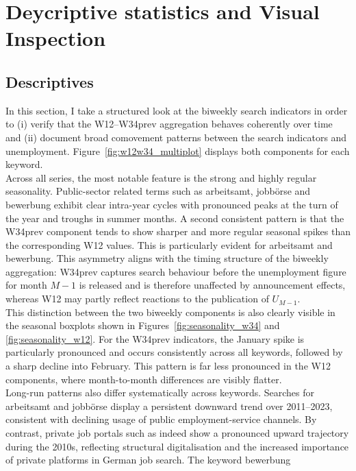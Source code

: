 \documentclass[12pt,a4paper]{article}
\begin{document}
\section{Deycriptive statistics and Visual Inspection}

\subsection{Descriptives}
In this section, I take a structured look at the biweekly search indicators in order to 
(i) verify that the W12–W34prev aggregation behaves coherently over time and 
(ii) document broad comovement patterns between the search indicators and unemployment.  
Figure~\ref{fig:w12w34_multiplot} displays both components for each keyword.\\
Across all series, the most notable feature is the strong and highly regular 
seasonality. Public-sector related terms such as arbeitsamt, jobbörse
and bewerbung exhibit clear intra-year cycles with pronounced peaks at the turn 
of the year and troughs in summer months. A second consistent pattern is that the 
W34prev component tends to show sharper and more regular seasonal spikes than the 
corresponding W12 values. This is particularly evident for arbeitsamt and 
bewerbung. 
This asymmetry aligns with the timing structure of the biweekly 
aggregation: W34prev captures search behaviour before the unemployment figure for month 
$M{-}1$ is released and is therefore unaffected by announcement effects, whereas W12 
may partly reflect reactions to the publication of $U_{M-1}$.\\
This distinction between the two biweekly components is also clearly visible in the
seasonal boxplots shown in Figures~\ref{fig:seasonality_w34} and \ref{fig:seasonality_w12}. For the W34prev indicators, the January spike is 
particularly pronounced and occurs consistently across all keywords, followed by a 
sharp decline into February. This pattern is far less pronounced in the W12 
components, where month-to-month differences are visibly flatter.\\
Long-run patterns also differ systematically across keywords. Searches for 
arbeitsamt and jobbörse display a persistent downward trend over 
2011--2023, consistent with declining usage of public employment-service channels.  
By contrast, private job portals such as indeed show a pronounced upward 
trajectory during the 2010s, reflecting structural digitalisation and the increased 
importance of private platforms in German job search. The keyword bewerbung 
\end{document}
